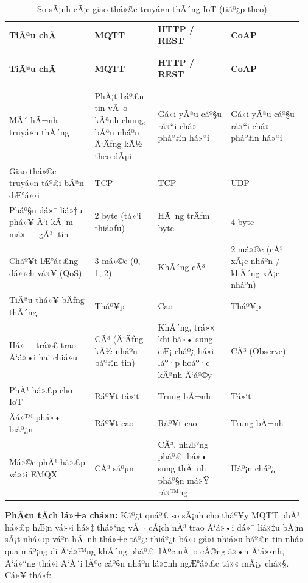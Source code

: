 \documentclass[a4paper]{extarticle}
\newcommand{\thesissettableid}[2]{%
  \renewcommand{\thetable}{#1}%
  \renewcommand{\theHtable}{#2}%
}
\begin{document}
{\thesissettableid{2.2}{tab-ch2-iot-communication-protocols}
\def\LTcaptype{table}
\begin{longtable}{|L{0.279\linewidth}|L{0.206\linewidth}|L{0.232\linewidth}|L{0.238\linewidth}|}
\caption{So sÃ¡nh cÃ¡c giao thá»©c truyá»n thÃ´ng IoT}\label{tab:ch2-iot-communication-protocols}\\
\hline \textbf{TiÃªu chÃ­} & \textbf{MQTT} & \textbf{HTTP / REST} & \textbf{CoAP} \\
\\\hline
\endfirsthead
\caption[]{So sÃ¡nh cÃ¡c giao thá»©c truyá»n thÃ´ng IoT (tiáº¿p theo)}\\
\hline \textbf{TiÃªu chÃ­} & \textbf{MQTT} & \textbf{HTTP / REST} & \textbf{CoAP} \\
\\\hline
\endhead
\\\hline
\endfoot
\endlastfoot
MÃ´ hÃ¬nh truyá»n thÃ´ng & PhÃ¡t báº£n tin vÃ o kÃªnh chung, bÃªn nháº­n Ä‘Äƒng kÃ½
theo dÃµi & Gá»­i yÃªu cáº§u rá»“i chá» pháº£n há»“i &
Gá»­i yÃªu cáº§u rá»“i chá» pháº£n há»“i \\\hline
Giao thá»©c truyá»n táº£i bÃªn dÆ°á»›i & TCP & TCP & UDP \\\hline
Pháº§n dá»¯ liá»‡u phá»¥ Ä‘i kÃ¨m má»—i gÃ³i tin & 2 byte (tá»‘i thiá»ƒu) & HÃ ng trÄƒm
byte & 4 byte \\\hline
Cháº¥t lÆ°á»£ng dá»‹ch vá»¥ (QoS) & 3 má»©c (0, 1, 2) & KhÃ´ng cÃ³ & 2 má»©c
(cÃ³ xÃ¡c nháº­n / khÃ´ng xÃ¡c nháº­n) \\\hline
TiÃªu thá»¥ bÄƒng thÃ´ng & Tháº¥p & Cao & Tháº¥p \\\hline
Há»— trá»£ trao Ä‘á»•i hai chiá»u & CÃ³ (Ä‘Äƒng kÃ½ nháº­n báº£n tin) & KhÃ´ng, trá»« khi
bá»• sung cÆ¡ cháº¿ há»i láº·p hoáº·c kÃªnh Ä‘áº©y & CÃ³ (Observe) \\\hline
PhÃ¹ há»£p cho IoT & Ráº¥t tá»‘t & Trung bÃ¬nh & Tá»‘t \\\hline
Äá»™ phá»• biáº¿n & Ráº¥t cao & Ráº¥t cao & Trung bÃ¬nh \\\hline
Má»©c phÃ¹ há»£p vá»›i EMQX & CÃ³ sáºµn & CÃ³, nhÆ°ng pháº£i bá»• sung thÃ nh pháº§n má»Ÿ rá»™ng
& Háº¡n cháº¿ \\\hline
\end{longtable}
}

\textbf{PhÃ¢n tÃ­ch lá»±a chá»n:} Káº¿t quáº£ so sÃ¡nh cho tháº¥y MQTT phÃ¹ há»£p hÆ¡n
vá»›i há»‡ thá»‘ng vÃ¬ cÃ¡ch nÃ³ trao Ä‘á»•i dá»¯ liá»‡u bÃ¡m sÃ¡t nhá»‹p váº­n hÃ nh thá»±c táº¿:
thiáº¿t bá»‹ gá»­i nhiá»u báº£n tin nhá» qua máº¡ng di Ä‘á»™ng khÃ´ng pháº£i lÃºc nÃ o cÅ©ng
á»•n Ä‘á»‹nh, Ä‘á»“ng thá»i Ä‘Ã´i lÃºc cáº§n nháº­n lá»‡nh ngÆ°á»£c tá»« mÃ¡y chá»§. Cá»¥ thá»ƒ:
\end{document}
